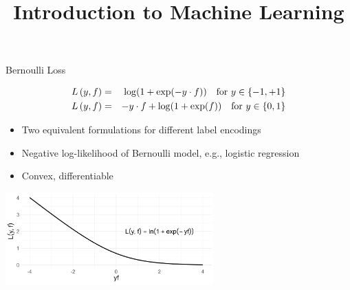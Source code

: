 \documentclass[11pt,compress,t,notes=noshow, xcolor=table]{beamer}
\title{Introduction to Machine Learning}
\begin{document}
    

\begin{vbframe}{Bernoulli Loss}

\vspace*{-0.5cm}
\begin{eqnarray*}
  L\left(y, f\right) &=& \log(1+\exp(-y \cdot f)) \quad \text{for } y \in \{-1, +1\}\\
  L\left(y, f\right) &=& - y \cdot f + \log(1 + \exp(f)) \quad \text{for } y \in \{0, 1\} 
\end{eqnarray*}


\begin{itemize}
  \item Two equivalent formulations for different label encodings
  \item Negative log-likelihood of Bernoulli model, e.g., logistic regression
  \item Convex, differentiable
\end{itemize}

\vspace{0.2cm}
\begin{center}
\includegraphics[width = 8cm]{figure/bernoulli_margin.png}
\end{center}

\end{vbframe}
\end{document}
